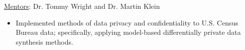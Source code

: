 \documentclass[11.5pt, letterpaper, roman]{moderncv} %
\begin{document}
\vspace{4pt}
{\underline{Mentors}: Dr. Tommy Wright and Dr. Martin Klein
\begin{itemize}
\item Implemented methods of data privacy and confidentiality to U.S. Census Bureau data; specifically, applying model-based differentially private data synthesis methods.
\end{itemize}}



\newpage
\end{document}
